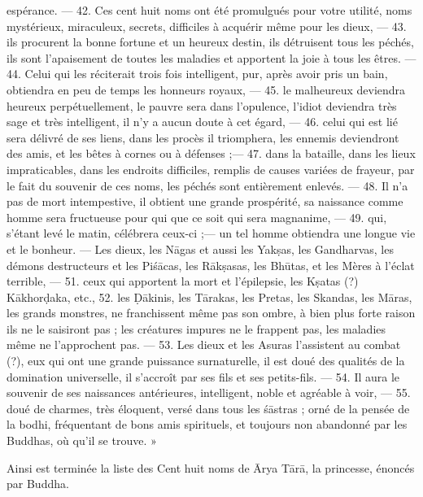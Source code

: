 \documentclass[a4paper, 11pt, oneside, french]{article}
\begin{document}
espérance. --- 42. Ces cent huit noms ont été promulgués pour votre utilité, noms mystérieux, miraculeux, secrets, difficiles à acquérir même pour les dieux, --- 43. ils procurent la bonne fortune et un heureux destin, ils détruisent tous les péchés, ils sont l'apaisement de toutes les maladies et apportent la joie à tous les êtres. --- 44. Celui qui les réciterait trois fois intelligent, pur, après avoir pris un bain, obtiendra en peu de temps les honneurs royaux, --- 45. le malheureux deviendra heureux perpétuellement, le pauvre sera dans l'opulence, l'idiot deviendra très sage et très intelligent, il n'y a aucun doute à cet égard, --- 46. celui qui est lié sera délivré de ses liens, dans les procès il triomphera, les ennemis deviendront des amis, et les bêtes à cornes ou à défenses ;--- 47. dans la bataille, dans les lieux impraticables, dans les endroits difficiles, remplis de causes variées de frayeur, par le fait du souvenir de ces noms, les péchés sont entièrement enlevés. --- 48. Il n'a pas de mort intempestive, il obtient une grande prospérité, sa naissance comme homme sera fructueuse pour qui que ce soit qui sera magnanime, --- 49. qui, s'étant levé le matin, célébrera ceux-ci ;--- un tel homme obtiendra une longue vie et le bonheur. --- Les dieux, les N\={a}gas et aussi les Yak\d{s}as, les Gandharvas, les démons destructeurs et les Pi\'{s}\={a}cas, les R\={a}k\d{s}asas, les Bh\={u}tas, et les Mères à l'éclat terrible, --- 51. ceux qui apportent la mort et l'épilepsie, les K\d{s}atas (?) K\={a}khor\d{d}aka, etc., 52. les Ḍ\={a}kinis, les T\={a}rakas, les Pretas, les Skandas, les M\={a}ras, les grands monstres, ne franchissent même pas son ombre, à bien plus forte raison ils ne le saisiront pas ; les créatures impures ne le frappent pas, les maladies même ne l'approchent pas. --- 53. Les dieux et les Asuras l'assistent au combat (?), eux qui ont une grande puissance surnaturelle, il est doué des qualités de la domination universelle, il s'accroît par ses fils et ses petits-fils. --- 54. Il aura le souvenir de ses naissances antérieures, intelligent, noble et agréable à voir, --- 55. doué de charmes, très éloquent, versé dans tous les \'{s}\={a}stras ; orné de la pensée de la bodhi, fréquentant de bons amis spirituels, et toujours non abandonné par les Buddhas, où qu'il se trouve. »

Ainsi est terminée la liste des Cent huit noms de \={A}rya T\={a}r\={a}, la princesse, énoncés par Buddha.
\clearpage
\end{document}
